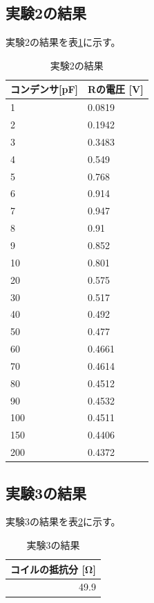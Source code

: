 \documentclass[11pt,a4paper,fleqn]{jsarticle}
\begin{document}
\subsection{実験2の結果}
実験2の結果を表\ref{cal:result2}に示す。
\begin{table}[!h]
\centering
\caption{実験2の結果}
\label{cal:result2}
\begin{tabular}{|l|l|}
\hline
コンデンサ{[}pF{]} & Rの電圧 {[}V{]} \\ \hline
1             & 0.0819       \\ \hline
2             & 0.1942       \\ \hline
3             & 0.3483       \\ \hline
4             & 0.549        \\ \hline
5             & 0.768        \\ \hline
6             & 0.914        \\ \hline
7             & 0.947        \\ \hline
8             & 0.91         \\ \hline
9             & 0.852        \\ \hline
10            & 0.801        \\ \hline
20            & 0.575        \\ \hline
30            & 0.517        \\ \hline
40            & 0.492        \\ \hline
50            & 0.477        \\ \hline
60            & 0.4661       \\ \hline
70            & 0.4614       \\ \hline
80            & 0.4512       \\ \hline
90            & 0.4532       \\ \hline
100           & 0.4511       \\ \hline
150           & 0.4406       \\ \hline
200           & 0.4372       \\ \hline
\end{tabular}
\end{table}
\subsection{実験3の結果}
実験3の結果を表\ref{cal:result3}に示す。
\begin{table}[!h]
\centering
\caption{実験3の結果}
\label{cal:result3}
\begin{tabular}{|l|}
\hline
コイルの抵抗分 {[}Ω{]}            \\ \hline
\multicolumn{1}{|r|}{49.9} \\ \hline
\end{tabular}
\end{table}
\clearpage
\end{document}
